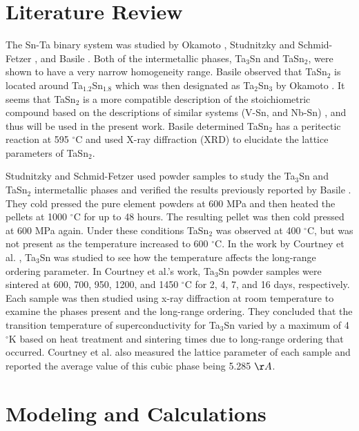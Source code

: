\section{Literature Review}

The Sn-Ta binary system was studied by Okamoto \cite{Okamoto2003}, Studnitzky and Schmid-Fetzer \cite{Studnitzky2002}, and Basile \cite{Basile1971}. Both of the intermetallic phases, Ta$_{3}$Sn and TaSn$_{2}$, were shown to have a very narrow homogeneity range. Basile \cite{Basile1971} observed that TaSn$_{2}$ is located around Ta$_{1.2}$Sn$_{1.8}$ which was then designated as Ta$_2$Sn$_3$ by Okamoto \cite{Okamoto2003}. It seems that TaSn$_2$ is a more compatible description of the stoichiometric compound based on the descriptions of similar systems (V-Sn, and Nb-Sn) \cite{Yue2009,Toffolon1998,Toffolon2002}, and thus will be used in the present work. Basile \cite{Basile1971} determined TaSn$_2$ has a peritectic reaction at 595 $^{\circ}$C and used X-ray diffraction (XRD) to elucidate the lattice parameters of TaSn$_2$.  

Studnitzky and Schmid-Fetzer \cite{Studnitzky2002} used powder samples to study the Ta$_3$Sn and TaSn$_2$ intermetallic phases and verified the results previously reported by Basile \cite{Basile1971}. They cold pressed the pure element powders at 600 MPa and then heated the pellets at 1000 $^{\circ}$C for up to 48 hours.  The resulting pellet was then cold pressed at 600 MPa again. Under these conditions TaSn$_2$ was observed at 400 $^{\circ}$C, but was not present as the temperature increased to 600 $^{\circ}$C.  In the work by Courtney et al. \cite{Courtney1965}, Ta$_3$Sn was studied to see how the temperature affects the long-range ordering parameter. In Courtney et al.'s work, Ta$_3$Sn powder samples were sintered at 600, 700, 950, 1200, and 1450 $^{\circ}$C for 2, 4, 7, and 16 days, respectively.  Each sample was then studied using x-ray diffraction at room temperature to examine the phases present and the long-range ordering. They concluded that the transition temperature of superconductivity for Ta$_3$Sn varied by a maximum of 4 $^{\circ}$K based on heat treatment and sintering times due to long-range ordering that occurred. Courtney et al. also measured the lattice parameter of each sample and reported the average value of this cubic phase being 5.285 $\AA$.


\section{Modeling and Calculations}

